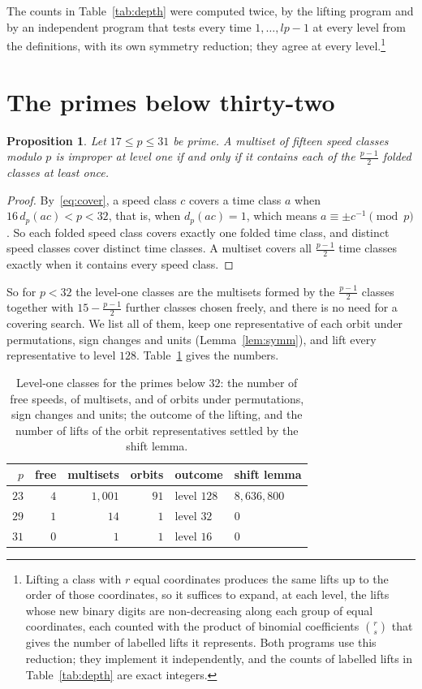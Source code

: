 \documentclass[11pt]{amsart}
\newtheorem{proposition}[theorem]{Proposition}
\theoremstyle{definition}
\theoremstyle{remark}
\begin{document}
The counts in Table~\ref{tab:depth} were computed twice, by the lifting
program and by an independent program that tests every time
$1,\dots,lp-1$ at every level from the definitions, with its own symmetry
reduction; they agree at every level.\footnote{Lifting a class with $r$
equal coordinates produces the same lifts up to the order of those
coordinates, so it suffices to expand, at each level, the lifts whose new
binary digits are non-decreasing along each group of equal coordinates,
each counted with the product of binomial coefficients $\binom{r}{s}$ that
gives the number of labelled lifts it represents. Both programs use this
reduction; they implement it independently, and the counts of labelled lifts
in Table~\ref{tab:depth} are exact integers.}

\section{The primes below thirty-two}\label{sec:small}

\begin{proposition}\label{prop:small}
Let $17\le p\le31$ be prime. A multiset of fifteen speed classes modulo $p$
is improper at level one if and only if it contains each of the
$\frac{p-1}2$ folded classes at least once.
\end{proposition}

\begin{proof}
By~\eqref{eq:cover}, a speed class $c$ covers a time class $a$ when
$16\,d_p(ac)<p<32$, that is, when $d_p(ac)=1$, which means $a\equiv\pm
c^{-1}\pmod p$. So each folded speed class covers exactly one folded time
class, and distinct speed classes cover distinct time classes. A multiset
covers all $\frac{p-1}2$ time classes exactly when it contains every speed
class.
\end{proof}

So for $p<32$ the level-one classes are the multisets formed by the
$\frac{p-1}2$ classes together with $15-\frac{p-1}2$ further classes chosen
freely, and there is no need for a covering search. We list all of them,
keep one representative of each orbit under permutations, sign changes and
units (Lemma~\ref{lem:symm}), and lift every representative to level $128$.
Table~\ref{tab:small} gives the numbers.

\begin{table}[t]
\caption{Level-one classes for the primes below $32$: the number of free
speeds, of multisets, and of orbits under permutations, sign changes and
units; the outcome of the lifting, and the number of lifts of the orbit
representatives settled by the shift lemma.}
\label{tab:small}
\centering
\small
\begin{tabular}{@{}rrrrll@{}}
\toprule
$p$ & free & multisets & orbits & outcome & shift lemma\\
\midrule
$23$ & $4$ & $1{,}001$ & $91$ & level $128$ & $8{,}636{,}800$\\
$29$ & $1$ & $14$ & $1$ & level $32$ & $0$\\
$31$ & $0$ & $1$ & $1$ & level $16$ & $0$\\
\bottomrule
\end{tabular}
\end{table}
\end{document}
